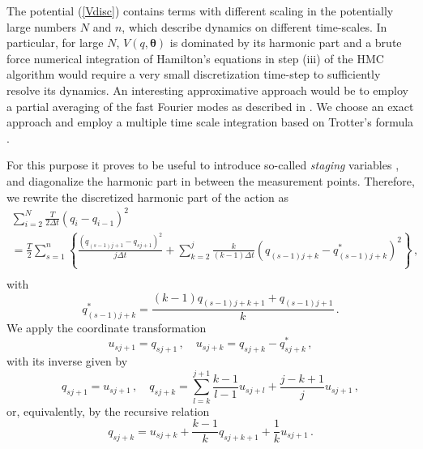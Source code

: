 \documentclass[12pt,a4paper,final]{iopart}
\newcommand{\bt}{\pmb\theta}
\begin{document}
The potential (\ref{Vdisc}) contains terms with different scaling in the potentially large numbers $N$ and $n$, which describe dynamics on different time-scales.
In particular, for large $N$, $V(q,\bt)$ is dominated by its harmonic part and a brute force numerical integration of Hamilton's equations in step (iii) of the HMC algorithm would require a very small discretization time-step to sufficiently resolve its dynamics.
An interesting approximative approach would be to employ a partial averaging of the fast Fourier modes as described in \cite{doll_1985_fourier}.
We choose an exact approach and employ a multiple time scale integration based on Trotter's formula \cite{tuckerman1993efficient}.

For this purpose it proves to be useful to introduce so-called \emph{staging} variables \cite{tuckerman1992reversible}, and diagonalize the harmonic part in between the measurement points.
Therefore, we rewrite the discretized harmonic part of the action as
\begin{eqnarray}
  \sum_{i=2}^{N}
  \frac{T}{2\Delta t}
  (q_i-q_{i-1})^2 \nonumber
  \\ =
  \frac{T}{2}
  \sum_{s=1}^{n}\left\{
    \frac{(q_{(s-1)j+1} - q_{sj+1})^2}{j\Delta t}
    +
    \sum_{k=2}^j
    \frac{k}{(k-1)\Delta t}
    (q_{(s-1)j+k}-q^*_{(s-1)j+k})^2
  \right\}\,,\nonumber
  \\
\end{eqnarray}
with
\begin{equation}
  q^*_{(s-1)j+k}
  =
  \frac{(k-1)q_{(s-1)j+k+1} + q_{(s-1)j+1} }{k}
  \,.
\end{equation}
We apply the coordinate transformation
\begin{equation}
  u_{sj+1} = q_{sj+1}\,,\quad
  u_{sj+k} = q_{sj+k} - q^*_{sj+k}\,,
\end{equation}
with its inverse given by
\begin{equation}
  q_{sj+1} = u_{sj+1}\,,\quad
  q_{sj+k} = \sum_{l=k}^{j+1}\frac{k-1}{l-1}u_{sj+l}
  +\frac{j-k+1}{j}u_{sj+1}\,,
\end{equation}
or, equivalently, by the recursive relation
\begin{equation}
  q_{sj+k} = u_{sj+k} + \frac{k-1}{k} q_{sj+k+1}+ \frac{1}{k}u_{sj+1} \,.
\end{equation}
\end{document}

